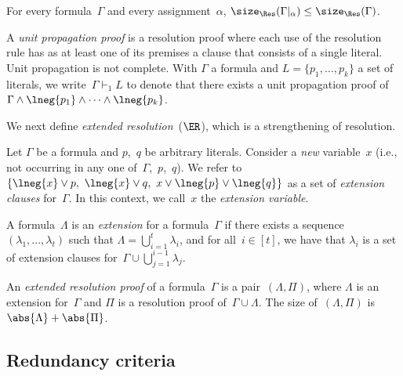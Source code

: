 \documentclass[12pt]{article}
\begin{document}
\begin{lemma}\label{thm:resolution-under-restrictions}
  For every formula~$\Gamma$ and every assignment~$\alpha$,
  $\size_\Res(\Gamma|_\alpha) \leq \size_\Res(\Gamma)$.
\end{lemma}

A \emph{unit propagation proof} is a resolution proof
where each use of the resolution rule
has as at least one of its premises
a clause that consists of a single literal.
Unit propagation is not complete.
With $\Gamma$ a formula and $L = \{p_1, \dots, p_k\}$ a set of literals,
we write~$\Gamma \vdash_1 L$ to denote that
there exists a unit propagation proof
of~$\Gamma \land \lneg{p_1} \land \dots \land \lneg{p_k}$.

We next define \emph{extended resolution}~($\ER$),
which is a strengthening of resolution.

\begin{definition}\label{def:extension-clauses}
  Let $\Gamma$ be a formula and $p$,~$q$ be arbitrary literals.
  Consider a \emph{new} variable~$x$
  (i.e., not occurring in any one of~$\Gamma$,~$p$,~$q$).
  We refer to $\{\lneg{x} \lor p,\ \lneg{x} \lor q,\ x \lor \lneg{p} \lor \lneg{q}\}$
  as a set of \emph{extension clauses} for~$\Gamma$.
  In this context, we call~$x$ the \emph{extension variable}.
\end{definition}

\begin{definition}
  A formula~$\Lambda$ is an \emph{extension} for a formula~$\Gamma$
  if there exists a sequence~$(\lambda_1, \dots, \lambda_t)$
  such that $\Lambda = \bigcup_{i = 1}^t \lambda_i$,
  and for all~$i \in [t]$, we have that $\lambda_i$ is a set of
  extension clauses for~$\Gamma \cup \bigcup_{j = 1}^{i - 1} \lambda_j$.
\end{definition}

\begin{definition}
  An \emph{extended resolution proof} of a formula~$\Gamma$
  is a pair~$(\Lambda, \Pi)$,
  where $\Lambda$ is an extension for~$\Gamma$
  and $\Pi$ is a resolution proof of~$\Gamma \cup \Lambda$.
  The size of~$(\Lambda, \Pi)$ is~$\abs{\Lambda} + \abs{\Pi}$.
\end{definition}

\subsection{Redundancy criteria}
\label{sec:redundancy-criteria}
\end{document}

